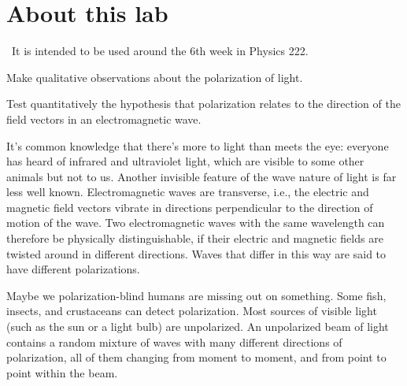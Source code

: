 \renewcommand\thechapter{c2.6a}
\label{lab:polarization}

\section*{About this lab}

\covid\ 
It is intended to be used around the 6th week in Physics 222.

\apparatus
{}


\begin{goals}

\item[] Make qualitative observations about the polarization of light.

\item[] Test quantitatively the hypothesis that polarization
relates to the direction of the field vectors in an
electromagnetic wave.
\end{goals}

\introduction

 It's common knowledge that there's more to light than meets
the eye: everyone has heard of infrared and ultraviolet
light, which are visible to some other animals but not to
us. Another invisible feature of the wave nature of light is
far less well known. Electromagnetic waves are transverse,
i.e., the electric and magnetic field vectors vibrate in
directions perpendicular to the direction of motion of the
wave. Two electromagnetic waves with the same wavelength can
therefore be physically distinguishable, if their electric
and magnetic fields are twisted around in different
directions. Waves that differ in this way are said to have
different polarizations.


Maybe we polarization-blind humans are missing out on
something. Some fish, insects, and crustaceans can detect
polarization. Most sources of
visible light (such as the sun or a light bulb) are
unpolarized. An unpolarized beam of light contains a random
mixture of waves with many different directions of
polarization, all of them changing from moment to moment,
and from point to point within the beam.

